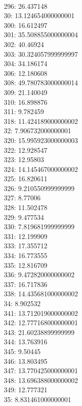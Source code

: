 \begin{multicols}{4}
  \\ 296: 26.437148
  \\ 30: 13.124654000000001
  \\ 300: 16.612497
  \\ 301: 35.508855000000004
  \\ 302: 40.46924
  \\ 303: 30.324057999999997
  \\ 304: 34.186174
  \\ 306: 12.180608
  \\ 308: 49.780783000000014
  \\ 309: 21.140049
  \\ 310: 16.898876
  \\ 311: 9.782459
  \\ 318: 11.424189000000002
  \\ 32: 7.906732000000001
  \\ 320: 15.995923000000003
  \\ 322: 12.928547
  \\ 323: 12.95803
  \\ 324: 14.145467000000002
  \\ 325: 16.820611
  \\ 326: 9.210550999999999
  \\ 327: 8.77006
  \\ 328: 11.502478
  \\ 329: 9.477534
  \\ 330: 7.819681999999999
  \\ 331: 12.199909
  \\ 333: 17.355712
  \\ 334: 16.773555
  \\ 335: 12.816709
  \\ 336: 9.472820000000002
  \\ 337: 16.717836
  \\ 338: 14.435681000000002
  \\ 34: 8.902532
  \\ 341: 13.712019000000002
  \\ 342: 12.777168000000001
  \\ 343: 21.60238899999999
  \\ 344: 13.763916
  \\ 345: 9.50445
  \\ 346: 13.803495
  \\ 347: 13.770425000000001
  \\ 348: 13.696388000000002
  \\ 349: 12.777321
  \\ 35: 8.831461000000001

\end{multicols}
